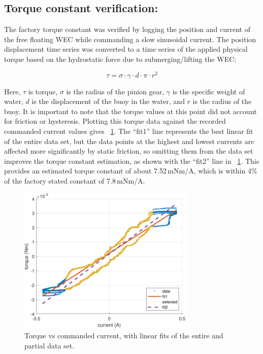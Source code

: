 \documentclass[11pt, letterpaper]{article}
\begin{document}
\subsection{Torque constant verification:}\label{tConstSec}
The factory torque constant was verified by logging the position and current of the free floating WEC while commanding a slow sinusoidal current.
The position displacement time series was converted to a time series of the applied physical torque based on the hydrostatic force due to submerging/lifting the WEC:

\begin{equation}
  \tau = \sigma \cdot \gamma \cdot d \cdot \pi \cdot r^2
\end{equation}

\noindent{}Here, $\tau$ is torque, $\sigma$ is the radius of the pinion gear, $\gamma$ is the specific weight of water, $d$ is the displacement of the buoy in the water, and $r$ is the radius of the buoy.
It is important to note that the torque values at this point did not account for friction or hysteresis.
Plotting this torque data against the recorded commanded current values gives  \figurename~\ref{fig:TorqueConstant}.
The ``fit1'' line represents the best linear fit of the entire data set, but the data points at the highest and lowest currents are affected more significantly by static friction, so omitting them from the data set improves the torque constant estimation, as shown with the ``fit2'' line in \figurename~\ref{fig:TorqueConstant}.
This provides an estimated torque constant of about 7.52\,mNm/A, which is within 4\% of the factory stated constant of 7.8\,mNm/A.

\begin{figure}[tb]
  \centering
  \includegraphics[width=0.75\textwidth]{diagrams/TorqueConstant.pdf}
  \caption{Torque vs commanded current, with linear fits of the entire and partial data set.}
  \label{fig:TorqueConstant}
\end{figure}
\end{document}
